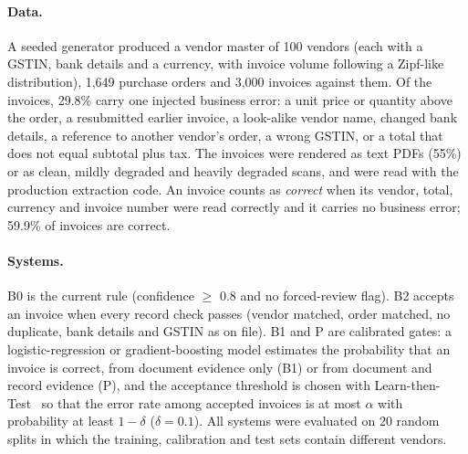 \paragraph{Data.} A seeded generator produced a vendor master of 100 vendors (each with a GSTIN, bank details and a currency, with invoice volume following a Zipf-like distribution), 1,649 purchase orders and 3,000 invoices against them. Of the invoices, 29.8\% carry one injected business error: a unit price or quantity above the order, a resubmitted earlier invoice, a look-alike vendor name, changed bank details, a reference to another vendor's order, a wrong GSTIN, or a total that does not equal subtotal plus tax. The invoices were rendered as text PDFs (55\%) or as clean, mildly degraded and heavily degraded scans, and were read with the production extraction code. An invoice counts as \emph{correct} when its vendor, total, currency and invoice number were read correctly and it carries no business error; 59.9\% of invoices are correct.

\paragraph{Systems.} B0 is the current rule (confidence $\ge$ 0.8 and no forced-review flag). B2 accepts an invoice when every record check passes (vendor matched, order matched, no duplicate, bank details and GSTIN as on file). B1 and P are calibrated gates: a logistic-regression or gradient-boosting model estimates the probability that an invoice is correct, from document evidence only (B1) or from document and record evidence (P), and the acceptance threshold is chosen with Learn-then-Test~\cite{angelopoulos2021ltt} so that the error rate among accepted invoices is at most $\alpha$ with probability at least $1-\delta$ ($\delta = 0.1$). All systems were evaluated on 20 random splits in which the training, calibration and test sets contain different vendors.

